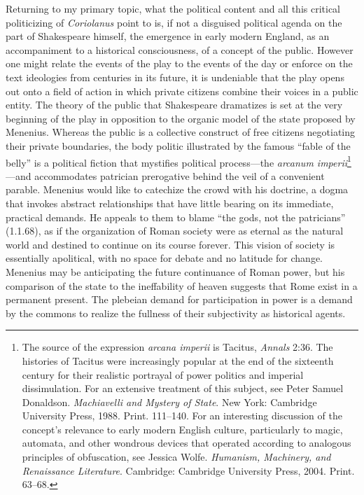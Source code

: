 Returning to my primary topic, what the political content and all this critical politicizing of \emph{Coriolanus} point to is, if not a disguised political agenda on the part of Shakespeare himself, the emergence in early modern England, as an accompaniment to a historical consciousness, of a concept of the public.
However one might relate the events of the play to the events of the day or enforce on the text ideologies from centuries in its future, it is undeniable that the play opens out onto a field of action in which private citizens combine their voices in a public entity.
The theory of the public that Shakespeare dramatizes is set at the very beginning of the play in opposition to the organic model of the state proposed by Menenius.
Whereas the public is a collective construct of free citizens negotiating their private boundaries, the body politic illustrated by the famous ``fable of the belly'' is a political fiction that mystifies political process---the \emph{arcanum imperii}\footnote{The source of the expression \emph{arcana imperii} is Tacitus, \emph{Annals} 2:36.
The histories of Tacitus were increasingly popular at the end of the sixteenth century for their realistic portrayal of power politics and imperial dissimulation.
For an extensive treatment of this subject, see Peter Samuel Donaldson. \emph{Machiavelli and Mystery of State}. New York: Cambridge University Press, 1988. Print. 111--140. \nocite{donaldson_machiavelli_1988}
For an interesting discussion of the concept's relevance to early modern English culture, particularly to magic, automata, and other wondrous devices that operated according to analogous principles of obfuscation, see Jessica Wolfe. \emph{Humanism, Machinery, and Renaissance Literature}. Cambridge: Cambridge University Press, 2004. Print. 63--68. \nocite{wolfe_humanism_2004}}
---and accommodates patrician prerogative behind the veil of a convenient parable.
Menenius would like to catechize the crowd with his doctrine, a dogma that invokes abstract relationships that have little bearing on its immediate, practical demands.
He appeals to them to blame ``the gods, not the patricians'' (1.1.68), as if the organization of Roman society were as eternal as the natural world and destined to continue on its course forever.
This vision of society is essentially apolitical, with no space for debate and no latitude for change.
Menenius may be anticipating the future continuance of Roman power, but his comparison of the state to the ineffability of heaven suggests that Rome exist in a permanent present.
The plebeian demand for participation in power is a demand by the commons to realize the fullness of their subjectivity as historical agents.
